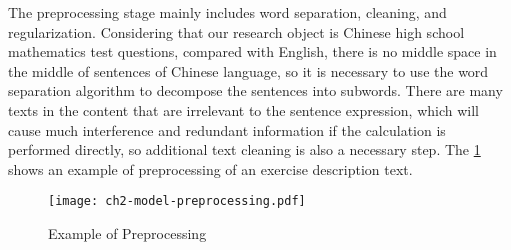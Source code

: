 

The preprocessing stage mainly includes word separation, cleaning, and regularization. Considering that our research object is Chinese high school mathematics test questions, compared with English, there is no middle space in the middle of sentences of Chinese language, so it is necessary to use the word separation algorithm to decompose the sentences into subwords. There are many texts in the content that are irrelevant to the sentence expression, which will cause much interference and redundant information if the calculation is performed directly, so additional text cleaning is also a necessary step. The \figurename{\ref{fig:ch2-model-preprocessing}} shows an example of preprocessing of an exercise description text.

\begin{figure}[H]
	\centering
	\texttt{[image: ch2-model-preprocessing.pdf]}
	\caption{Example of Preprocessing}\label{fig:ch2-model-preprocessing}
\end{figure}


